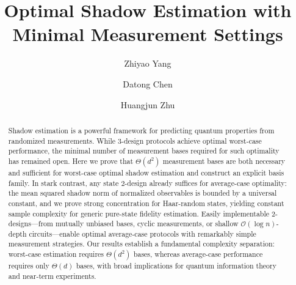 \documentclass[aps,pra,twocolumn,nofootinbib,superscriptaddress,10pt]{revtex4-2}
\begin{document}
\title{Optimal Shadow Estimation with Minimal Measurement Settings}
\author{Zhiyao Yang}
\author{Datong Chen}



\author{Huangjun Zhu}




	\begin{abstract}
Shadow estimation is a powerful framework for predicting quantum properties from randomized measurements. While $3$-design protocols achieve optimal worst-case performance, the minimal number of measurement bases required for such optimality has remained open. Here we prove that $\Theta(d^2)$ measurement bases are both necessary and sufficient for worst-case optimal shadow estimation and construct an explicit basis family. In stark contrast, any state $2$-design already suffices for average-case optimality: the mean squared shadow norm of normalized observables is bounded by a universal constant, and we prove strong concentration for Haar-random states, yielding constant sample complexity for generic pure-state fidelity estimation. Easily implementable $2$-designs---from mutually unbiased bases, cyclic measurements, or shallow $\mathcal{O}(\log n)$-depth circuits---enable optimal average-case protocols with remarkably simple measurement strategies. Our results establish a fundamental complexity separation: worst-case estimation requires $\Theta(d^2)$ bases, whereas average-case performance requires only $\Theta(d)$ bases, with broad implications for quantum information theory and near-term experiments.		
	\end{abstract}
	
\end{document}
